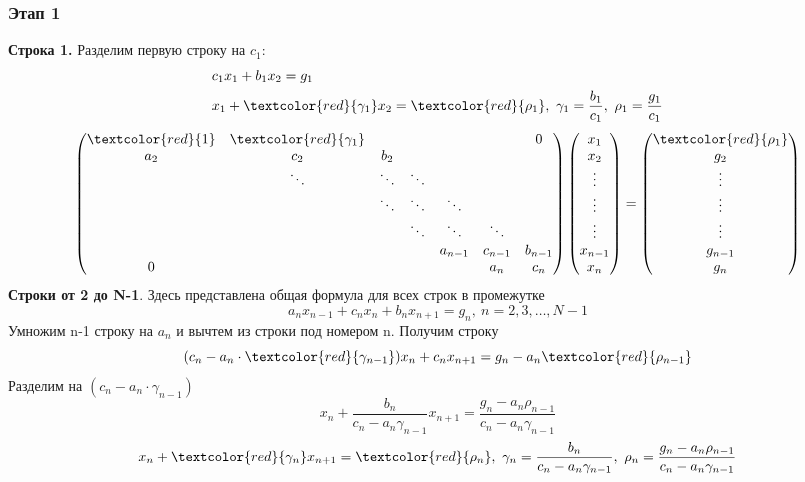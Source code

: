 \subsubsection*{Этап 1}
\textbf{Строка 1.} Разделим первую строку на $c_1$:
\begin{align*}
  &c_1 x_1+b_1x_2 = g_1 \\
  &x_1 + \textcolor{red}{\gamma_1} x_2 = \textcolor{red}{\rho_1},\ \gamma_1 = \frac{b_1}{c_1},\ \rho_1 = \frac{g_1}{c_1}
\end{align*}
\begin{align*}
  \begin{pmatrix}
    \textcolor{red}{1} & \textcolor{red}{\gamma_1} & &  &  &  & 0 \\
    a_2 & c_2 & b_2 &  & & & \\
     &   \ddots & \ddots & \ddots & & & \\
     & &  \ddots & \ddots & \ddots & &  \\
     & & & \ddots & \ddots & \ddots &  \\
     &  &  & & a_{n-1} & c_{n-1} & b_{n-1} \\
     0 & & & &  &a_n & c_n
  \end{pmatrix}
  \begin{pmatrix}
    x_1 \\
    x_2 \\
    \vdots \\
    \vdots \\
    \vdots \\
    x_{n-1} \\
    x_n
  \end{pmatrix} =
  \begin{pmatrix}
    \textcolor{red}{\rho_1} \\
    g_2 \\
    \vdots \\
    \vdots \\
    \vdots \\
    g_{n-1} \\
    g_n
  \end{pmatrix}
\end{align*}
\textbf{Строки от 2 до N-1}. Здесь представлена общая формула для всех строк в промежутке
\[	a_n x_{n-1} + c_n x_n + b_n x_{n + 1} = g_n,\ n = 2, 3, \dots, N-1 \]
Умножим n-1 строку на $a_n$ и вычтем из строки под номером n. Получим строку
\[ (c_n - a_n \cdot \textcolor{red}{\gamma_{n-1}})x_n + c_n x_{n + 1} = g_n - a_n \textcolor{red}{\rho_{n - 1}} \]
Разделим на $ (c_n - a_n \cdot \gamma_{n-1}) $
\[	x_n + \frac{b_n}{c_n - a_n \gamma_{n-1}} x_{n+1} = \frac{g_n - a_n \rho_{n-1}}{c_n - a_n\gamma_{n-1}} \]
\[	x_n + \textcolor{red}{\gamma_n} x_{n+1} = \textcolor{red}{\rho_n},\ \gamma_n = \frac{b_n}{c_n - a_n\gamma_{n-1}},\ \rho_n = \frac{g_n - a_n\rho_{n-1}}{c_n-a_n\gamma_{n-1}} \]

